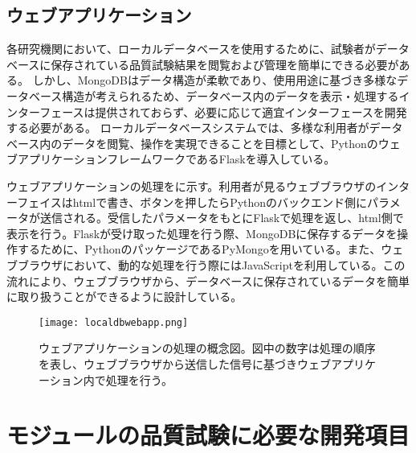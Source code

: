 \subsection{ウェブアプリケーション}
\label{sec:flask}

各研究機関において、ローカルデータベースを使用するために、試験者がデータベースに保存されている品質試験結果を閲覧および管理を簡単にできる必要がある。
しかし、MongoDBはデータ構造が柔軟であり、使用用途に基づき多様なデータベース構造が考えられるため、データベース内のデータを表示・処理するインターフェースは提供されておらず、必要に応じて適宜インターフェースを開発する必要がある。
ローカルデータベースシステムでは、多様な利用者がデータベース内のデータを閲覧、操作を実現できることを目標として、PythonのウェブアプリケーションフレームワークであるFlaskを導入している。

ウェブアプリケーションの処理をに示す。利用者が見るウェブブラウザのインターフェイスはhtmlで書き、ボタンを押したらPythonのバックエンド側にパラメータが送信される。受信したパラメータをもとにFlaskで処理を返し、html側で表示を行う。Flaskが受け取った処理を行う際、MongoDBに保存するデータを操作するために、PythonのパッケージであるPyMongoを用いている。また、ウェブブラウザにおいて、動的な処理を行う際にはJavaScriptを利用している。この流れにより、ウェブブラウザから、データベースに保存されているデータを簡単に取り扱うことができるように設計している。

\begin{figure}[tbp]
  \centering
  \texttt{[image: localdbwebapp.png]}
  \caption[ウェブアプリケーションの処理の概念図]{ウェブアプリケーションの処理の概念図。図中の数字は処理の順序を表し、ウェブブラウザから送信した信号に基づきウェブアプリケーション内で処理を行う。}
  \label{fig:webapp}
\end{figure}

\section{モジュールの品質試験に必要な開発項目}
\label{sec:okubottan}

